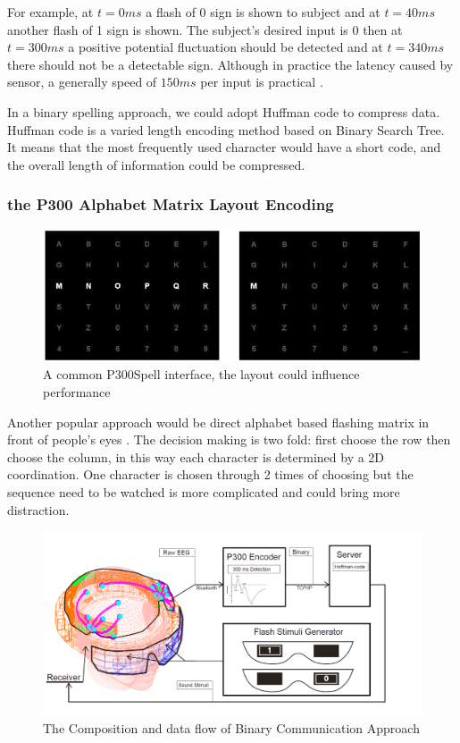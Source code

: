 \documentclass[a4paper]{article}
\begin{document}
For example, at $t = 0 ms$ a flash of 0 sign is shown to subject and at $t = 40 ms$ another flash of 1 sign is shown. The subject's desired input is 0 then at $t = 300 ms$ a positive potential fluctuation should be detected and at $t = 340 ms$ there should not be a detectable sign. Although in practice the latency caused by sensor, a generally speed of $150 ms$ per input is practical \autocite{sakai2012alphabet}. 

In a binary spelling approach, we could adopt Huffman code to compress data. Huffman code is a varied length encoding method based on Binary Search Tree. It means that the most frequently used character would have a short code, and the overall length of information could be compressed.

\subsubsection{the P300 Alphabet Matrix Layout Encoding}

\begin{figure}
	\centering
	\includegraphics[width=0.8 \linewidth]{P300Spell}
	\caption{A common P300Spell interface, the layout could influence performance}
	\label{fig:P300Spell}
\end{figure}

Another popular approach would be direct alphabet based flashing matrix in front of people's eyes \autocite{sakai2012alphabet}. The decision making is two fold: first choose the row then choose the column, in this way each character is determined by a 2D coordination. One character is chosen through 2 times of choosing but the sequence need to be watched is more complicated and could bring more distraction.

\begin{figure}
	\centering
	\includegraphics[width=\linewidth]{Holohead_full}
	\caption{The Composition and data flow of Binary Communication Approach}
	\label{fig:holohead}
\end{figure}
\end{document}
